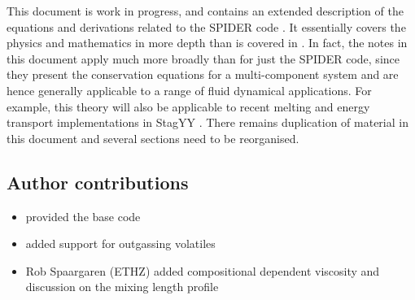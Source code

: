 This document is work in progress, and contains an extended description of the equations and derivations related to the SPIDER code \citep{BSW18}.  It essentially covers the physics and mathematics in more depth than is covered in \cite{ABE93,ABE95,BSW18}.  In fact, the notes in this document apply much more broadly than for just the SPIDER code, since they present the conservation equations for a multi-component system and are hence generally applicable to a range of fluid dynamical applications.  For example, this theory will also be applicable to recent melting and energy transport implementations in StagYY \citep{TACK08}.  There remains duplication of material in this document and several sections need to be reorganised.
\subsection{Author contributions}
\begin{itemize}
\item \cite{BSW18} provided the base code
\item \cite{BKW19} added support for outgassing volatiles
\item Rob Spaargaren (ETHZ) added compositional dependent viscosity and discussion on the mixing length profile
\end{itemize}